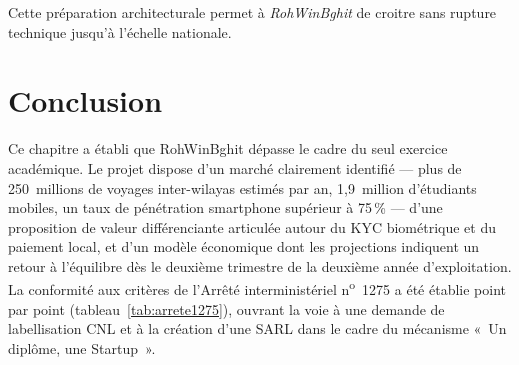 Cette préparation architecturale permet à \textit{RohWinBghit} de croitre sans rupture technique jusqu'à l'échelle nationale.

\section*{Conclusion}

Ce chapitre a établi que RohWinBghit dépasse le cadre du 
seul exercice académique. Le projet dispose d'un marché 
clairement identifié — plus de 250~millions de voyages 
inter-wilayas estimés par an, 1,9~million d'étudiants 
mobiles, un taux de pénétration smartphone supérieur à 
75\,\% — d'une proposition de valeur différenciante 
articulée autour du KYC biométrique et du paiement local, 
et d'un modèle économique dont les projections indiquent un 
retour à l'équilibre dès le deuxième trimestre de la 
deuxième année d'exploitation. La conformité aux critères 
de l'Arrêté interministériel n\textsuperscript{o}~1275 a 
été établie point par point (tableau~\ref{tab:arrete1275}), 
ouvrant la voie à une demande de labellisation CNL et à la 
création d'une SARL dans le cadre du mécanisme 
«~Un diplôme, une Startup~».
